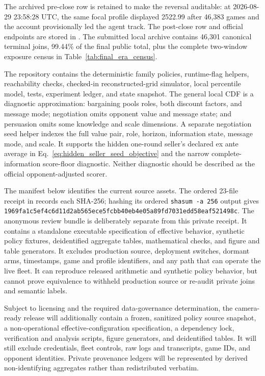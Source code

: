 The archived pre-close row is retained to make the reversal auditable: at
2026-08-29 23:58:28 UTC, the same focal profile displayed 2522.99 after 46,383
games and the account provisionally led the agent track. The post-close row and
official endpoints are stored in
. The submitted local
archive contains 46,301 canonical terminal joins, 99.44\% of the final public
total, plus the complete two-window exposure census in
Table~\ref{tab:final_era_census}.

The repository contains the deterministic family policies, runtime-flag
helpers, reachability checks, checked-in reconstructed-grid simulator, local percentile model,
tests, experiment ledger, and state snapshot. The general local CDF is a
diagnostic approximation: bargaining pools roles, both discount factors, and
message mode; negotiation omits opponent value and message state; and persuasion
omits some knowledge and scale dimensions. A separate negotiation seed helper
indexes the full value pair, role, horizon, information state, message mode, and
scale. It supports the hidden one-round seller's declared ex ante average in
Eq.~\eqref{eq:hidden_seller_seed_objective} and the narrow complete-information
score-floor diagnostic. Neither diagnostic should be described as the official
opponent-adjusted scorer.

The manifest below identifies the current source assets. The ordered 23-file
receipt in  records each
SHA-256; hashing its ordered \texttt{shasum -a 256} output gives
\texttt{1969fa1c5ef4c6d11d2ab565ece5fcbb40eb4e05a89fd7031edd58eaf521498c}.
The anonymous review bundle is deliberately separate from this private receipt.
It contains a standalone executable specification of effective behavior,
synthetic policy fixtures, deidentified aggregate tables, mathematical checks,
and figure and table generators. It excludes production source, deployment
switches, dormant arms, timestamps, game and profile identifiers, and any path
that can operate the live fleet. It can reproduce released arithmetic and
synthetic policy behavior, but cannot prove equivalence to withheld production
source or re-audit private joins and semantic labels.

Subject to licensing and the required data-governance determination, the
camera-ready release will additionally contain a frozen, sanitized policy
source snapshot, a non-operational effective-configuration specification, a
dependency lock, verification and analysis scripts, figure generators, and
deidentified tables. It will still exclude credentials, fleet controls, raw
logs and transcripts, game IDs, and opponent identities. Private provenance
ledgers will be represented by derived non-identifying aggregates rather than
redistributed verbatim.

